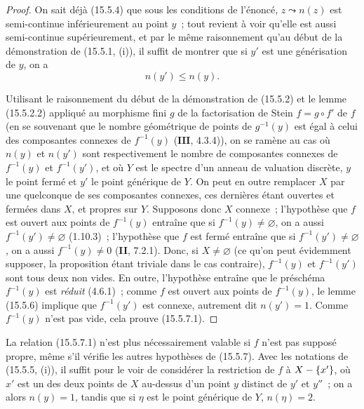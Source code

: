 \begin{proof}
On sait déjà (15.5.4) que sous les conditions de l'énoncé, $z\leadsto n(z)$ est semi-continue inférieurement au point $y$~; tout revient à voir qu'elle est aussi semi-continue supérieurement, et par le même raisonnement qu'au début de la démonstration de (15.5.1, (i)), il suffit de montrer que si $y'$ est une générisation de $y$, on a
\begin{equation}
\tag{15.5.7.1}
\label{IV.15.5.7.1-fr}
  n(y')\leqslant n(y).
\end{equation}

Utilisant le raisonnement du début de la démonstration de (15.5.2) et le lemme (15.5.2.2) appliqué au morphisme fini $g$ de la factorisation de Stein $f=g\circ f'$ de $f$ (en se souvenant que le nombre géométrique de points de $g^{-1}(y)$ est égal à celui des composantes connexes de $f^{-1}(y)$ ($\mathbf{III}$, 4.3.4)), on se ramène au cas où $n(y)$ et $n(y')$ sont respectivement le nombre de composantes connexes de $f^{-1}(y)$ et $f^{-1}(y')$, et où $Y$ est le spectre d'un anneau de valuation discrète, $y$ le point fermé et $y'$ le point générique de $Y$. On peut en outre remplacer $X$ par une quelconque de ses composantes connexes, ces dernières étant ouvertes et fermées dans $X$, et propres sur $Y$. Supposons donc $X$ connexe~; l'hypothèse que $f$ est ouvert aux points de $f^{-1}(y)$ entraîne que si $f^{-1}(y)\ne\varnothing$, on a aussi $f^{-1}(y')\ne\varnothing$ (1.10.3)~; l'hypothèse que $f$ est fermé entraîne que si $f^{-1}(y')\ne\varnothing$, on a aussi $f^{-1}(y)\ne 0$ (\textbf{II}, 7.2.1). Donc, si $X\ne\varnothing$ (ce qu'on peut évidemment supposer, la proposition étant triviale dans le cas contraire), $f^{-1}(y)$ et $f^{-1}(y')$ sont tous deux non vides. En outre, l'hypothèse entraîne que le préschéma $f^{-1}(y)$ est \emph{réduit} (4.6.1)~; comme $f$ est ouvert aux points de $f^{-1}(y)$, le lemme (15.5.6) implique que $f^{-1}(y')$ est connexe, autrement dit $n(y')=1$. Comme $f^{-1}(y)$ n'est pas vide, cela prouve (15.5.7.1).
\end{proof}

\begin{remark}[15.5.8]
\label{IV.15.5.8-fr}
La relation (15.5.7.1) n'est plus nécessairement valable si $f$ n'est pas supposé propre, même s'il vérifie les autres hypothèses de (15.5.7). Avec les notations de (15.5.5, (i)), il suffit pour le voir de considérer la restriction de $f$ à $X-\{x'\}$, où $x'$ est un des deux points de $X$ au-dessus d'un point $y$ distinct de $y'$ et $y''$~; on a alors $n(y)=1$, tandis que si $\eta$ est le point générique de $Y$, $n(\eta)=2$.
\end{remark}

